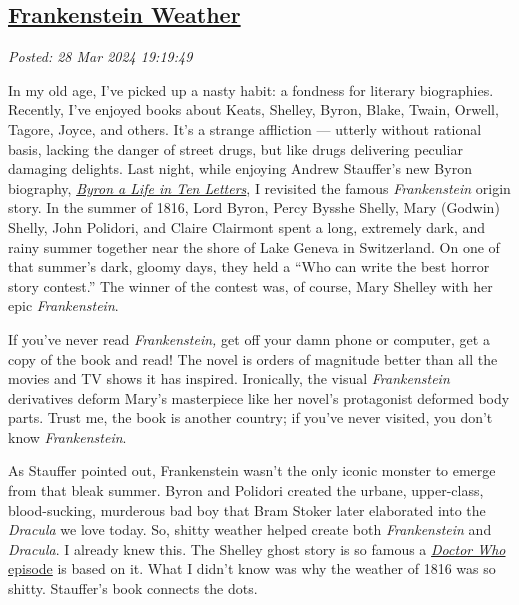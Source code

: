 %

\subsection*{\href{http://analyzethedatanotthedrivel.org/2024/03/28/frankenstein-weather/}{Frankenstein Weather}}


\noindent\emph{Posted: 28 Mar 2024 19:19:49}
\vspace{6pt}

In my old age, I've picked up a nasty habit: a fondness for literary
biographies. Recently, I've enjoyed books about Keats, Shelley, Byron,
Blake, Twain, Orwell, Tagore, Joyce, and others. It's a strange
affliction --- utterly without rational basis, lacking the danger of
street drugs, but like drugs delivering peculiar damaging delights. Last
night, while enjoying Andrew Stauffer's new Byron biography,
\href{https://www.amazon.com/Byron-Life-Letters-Andrew-Stauffer/dp/100920016X}{\emph{Byron
a Life in Ten Letters}}, I revisited the famous \emph{Frankenstein}
origin story. In the summer of 1816, Lord Byron, Percy Bysshe Shelly,
Mary (Godwin) Shelly, John Polidori, and Claire Clairmont spent a long,
extremely dark, and rainy summer together near the shore of Lake Geneva
in Switzerland. On one of that summer's dark, gloomy days, they held a
``Who can write the best horror story contest.'' The winner of the
contest was, of course, Mary Shelley with her epic \emph{Frankenstein}.

If you've never read \emph{Frankenstein,} get off your damn phone or
computer, get a copy of the book and read! The novel is orders of
magnitude better than all the movies and TV shows it has inspired.
Ironically, the visual \emph{Frankenstein} derivatives deform Mary's
masterpiece like her novel's protagonist deformed body parts. Trust me,
the book is another country; if you've never visited, you don't know
\emph{Frankenstein}.

As Stauffer pointed out, Frankenstein wasn't the only iconic monster to
emerge from that bleak summer. Byron and Polidori created the urbane,
upper-class, blood-sucking, murderous bad boy that Bram Stoker later
elaborated into the \emph{Dracula} we love today. So, shitty weather
helped create both \emph{Frankenstein} and \emph{Dracula}. I already
knew this. The Shelley ghost story is so famous a
\href{https://www.youtube.com/watch?v=Q8Tq5bfYudU}{\emph{Doctor Who}
episode} is based on it. What I didn't know was why the weather of 1816
was so shitty. Stauffer's book connects the dots.

